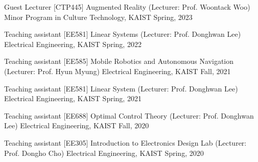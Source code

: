 

\begin{cventries}

  \cventry
    {Guest Lecturer} %
    {[CTP445] Augmented Reality (Lecturer: Prof. Woontack Woo)} %
    {Minor Program in Culture Technology, KAIST} %
    {Spring, 2023} %
    {}

  \cventry
    {Teaching assistant} %
    {[EE581] Linear Systems (Lecturer: Prof. Donghwan Lee)} %
    {Electrical Engineering, KAIST} %
    {Spring, 2022} %
    {}

  \cventry
    {Teaching assistant} %
    {[EE585] Mobile Robotics and Autonomous Navigation (Lecturer: Prof. Hyun Myung)} %
    {Electrical Engineering, KAIST} %
    {Fall, 2021} %
    {
    }

  \cventry
    {Teaching assistant} %
    {[EE581] Linear System (Lecturer: Prof. Donghwan Lee)} %
    {Electrical Engineering, KAIST} %
    {Spring, 2021} %
    {
    }

  \cventry
    {Teaching assistant} %
    {[EE688] Optimal Control Theory (Lecturer: Prof. Donghwan Lee)} %
    {Electrical Engineering, KAIST} %
    {Fall, 2020} %
    {
    }

  \cventry
    {Teaching assistant} %
    {[EE305] Introduction to Electronics Design Lab (Lecturer: Prof. Dongho Cho)} %
    {Electrical Engineering, KAIST} %
    {Spring, 2020} %
    {
    }
\end{cventries}
